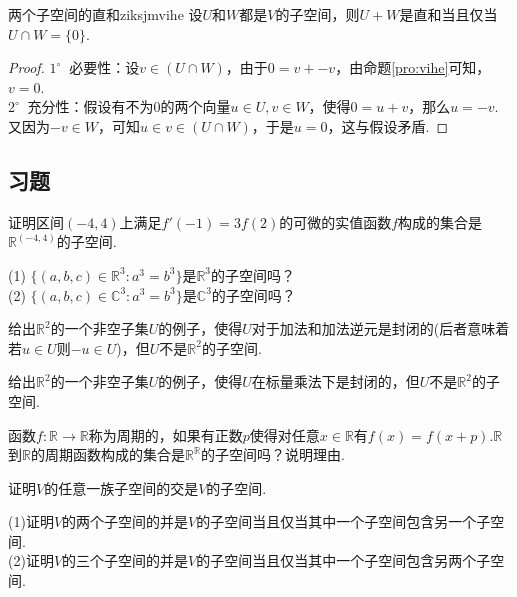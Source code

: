 \documentclass[lang=cn, zihao=5]{elegantbook}
\newcommand{\R}{\mathbb{R}}
\newcommand{\C}{\mathbb{C}}
\newcommand{\buzhou}[1]{$#1^{\circ} \ $}
\begin{document}
\begin{proposition}{两个子空间的直和}{ziksjmvihe}
    设$U$和$W$都是$V$的子空间，则$U+W$是直和当且仅当$U \cap W = \{ 0 \}$.
\end{proposition}
\begin{proof}
    \buzhou{1} 必要性：设$v \in (U \cap W)$，由于$0 = v + -v$，由命题\ref{pro:vihe}可知，$v = 0$. \\
    \buzhou{2} 充分性：假设有不为$0$的两个向量$u \in U,v \in W$，使得$0 = u + v$，那么$u = -v$.又因为$-v \in W$，可知$u \in v \in (U \cap W)$，于是$u=0$，这与假设矛盾.
\end{proof}

\subsection*{习题}

\begin{exercise}
	证明区间$(-4,4)$上满足$f'(-1)=3f(2)$的可微的实值函数$f$构成的集合是$\R ^{(-4,4)}$的子空间.
\end{exercise}

\begin{exercise}
	(1) $\{ (a,b,c) \in \R ^{3} : a^3 = b^3 \}$是$\R ^{3}$的子空间吗？ \\
	(2) $\{ (a,b,c) \in \C ^{3} : a^3 = b^3 \}$是$\C ^{3}$的子空间吗？
\end{exercise}

\begin{exercise}
	给出$\R ^2$的一个非空子集$U$的例子，使得$U$对于加法和加法逆元是封闭的(后者意味着若$u \in U$则$-u \in U$)，但$U$不是$\R ^2$的子空间.
\end{exercise}

\begin{exercise}
	给出$\R ^2$的一个非空子集$U$的例子，使得$U$在标量乘法下是封闭的，但$U$不是$\R ^2$的子空间.
\end{exercise}

\begin{exercise}
	函数$f : \R \to \R$称为周期的，如果有正数$p$使得对任意$x \in \R$有$f(x)=f(x+p)$.$\R$到$\R$的周期函数构成的集合是$\R ^{\R}$的子空间吗？说明理由.
\end{exercise}

\begin{exercise}
	证明$V$的任意一族子空间的交是$V$的子空间.
\end{exercise}

\begin{exercise} %
	(1)证明$V$的两个子空间的并是$V$的子空间当且仅当其中一个子空间包含另一个子空间. \\
	(2)证明$V$的三个子空间的并是$V$的子空间当且仅当其中一个子空间包含另两个子空间.
\end{exercise}
\end{document}
